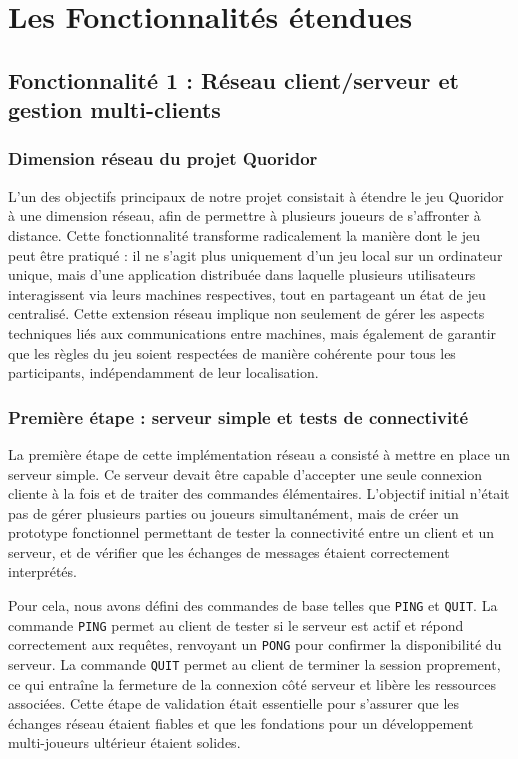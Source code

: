 \documentclass[a4paper]{article}
\begin{document}
\section{Les Fonctionnalités étendues}

\subsection{Fonctionnalité 1 : Réseau client/serveur et gestion multi-clients}


\subsubsection{Dimension réseau du projet Quoridor}


L’un des objectifs principaux de notre projet consistait à étendre le jeu Quoridor à une dimension réseau, afin de permettre à plusieurs joueurs de s’affronter à distance. Cette fonctionnalité transforme radicalement la manière dont le jeu peut être pratiqué : il ne s’agit plus uniquement d’un jeu local sur un ordinateur unique, mais d’une application distribuée dans laquelle plusieurs utilisateurs interagissent via leurs machines respectives, tout en partageant un état de jeu centralisé. Cette extension réseau implique non seulement de gérer les aspects techniques liés aux communications entre machines, mais également de garantir que les règles du jeu soient respectées de manière cohérente pour tous les participants, indépendamment de leur localisation.


\subsubsection{Première étape : serveur simple et tests de connectivité}


La première étape de cette implémentation réseau a consisté à mettre en place un serveur simple. Ce serveur devait être capable d’accepter une seule connexion cliente à la fois et de traiter des commandes élémentaires. L’objectif initial n’était pas de gérer plusieurs parties ou joueurs simultanément, mais de créer un prototype fonctionnel permettant de tester la connectivité entre un client et un serveur, et de vérifier que les échanges de messages étaient correctement interprétés.


Pour cela, nous avons défini des commandes de base telles que \texttt{PING} et \texttt{QUIT}. La commande \texttt{PING} permet au client de tester si le serveur est actif et répond correctement aux requêtes, renvoyant un \texttt{PONG} pour confirmer la disponibilité du serveur. La commande \texttt{QUIT} permet au client de terminer la session proprement, ce qui entraîne la fermeture de la connexion côté serveur et libère les ressources associées. Cette étape de validation était essentielle pour s’assurer que les échanges réseau étaient fiables et que les fondations pour un développement multi-joueurs ultérieur étaient solides.
\end{document}
